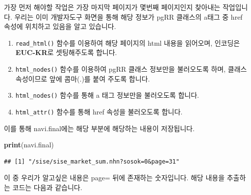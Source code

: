 \documentclass[12pt,]{book}
\newenvironment{Shaded}{\begin{snugshade}}{\end{snugshade}}
\newcommand{\DataTypeTok}[1]{\textcolor[rgb]{0.13,0.29,0.53}{#1}}
\newcommand{\DecValTok}[1]{\textcolor[rgb]{0.00,0.00,0.81}{#1}}
\newcommand{\KeywordTok}[1]{\textcolor[rgb]{0.13,0.29,0.53}{\textbf{#1}}}
\newcommand{\NormalTok}[1]{#1}
\newcommand{\OperatorTok}[1]{\textcolor[rgb]{0.81,0.36,0.00}{\textbf{#1}}}
\newcommand{\StringTok}[1]{\textcolor[rgb]{0.31,0.60,0.02}{#1}}
\providecommand{\tightlist}{%
  \setlength{\itemsep}{0pt}\setlength{\parskip}{0pt}}
\begin{document}
가장 먼저 해야할 작업은 가장 마지막 페이지가 몇번째 페이지인지 찾아내는 작업입니다. 우리는 이미 개발자도구 화면을 통해 해당 정보가 pgRR 클래스의 a태그 중 href 속성에 위치하고 있음을 알고 있습니다.

\begin{Shaded}
\end{Shaded}

\begin{enumerate}
\def\labelenumi{\arabic{enumi}.}
\tightlist
\item
  \texttt{read\_html()} 함수를 이용하여 해당 페이지의 html 내용을 읽어오며, 인코딩은 \textbf{EUC-KR}로 셋팅해주도록 합니다.
\item
  \texttt{html\_nodes()} 함수를 이용하여 pgRR 클래스 정보만을 불러오도록 하며, 클래스 속성이므로 앞에 콤마(.)를 붙여 주도록 합니다.
\item
  \texttt{html\_nodes()} 함수를 통해 a 태그 정보만을 불러오도록 합니다.
\item
  \texttt{html\_attr()} 함수를 통해 href 속성을 불러오도록 합니다.
\end{enumerate}

이를 통해 navi.final에는 해당 부분에 해당하는 내용이 저장됩니다.

\begin{Shaded}
\begin{Highlighting}[]
\KeywordTok{print}\NormalTok{(navi.final)}
\end{Highlighting}
\end{Shaded}

\begin{verbatim}
## [1] "/sise/sise_market_sum.nhn?sosok=0&page=31"
\end{verbatim}

이 중 우리가 알고싶은 내용은 page= 뒤에 존재하는 숫자입니다. 해당 내용을 추출하는 코드는 다음과 같습니다.

\begin{Shaded}
\end{Shaded}
\end{document}
